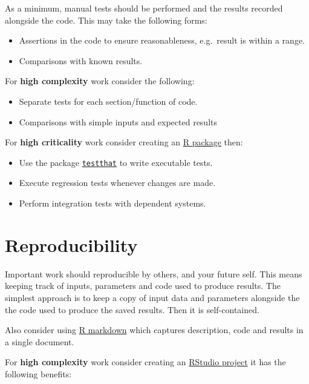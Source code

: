 \documentclass[]{book}
\providecommand{\tightlist}{%
  \setlength{\itemsep}{0pt}\setlength{\parskip}{0pt}}
\theoremstyle{definition}
\theoremstyle{definition}
\theoremstyle{definition}
\theoremstyle{remark}
\begin{document}
As a minimum, manual tests should be performed and the results recorded
alongside the code. This may take the following forms:

\begin{itemize}
\tightlist
\item
  Assertions in the code to ensure reasonableness, e.g.~result is within
  a range.
\item
  Comparisons with known results.
\end{itemize}

For \textbf{high complexity} work consider the following:

\begin{itemize}
\tightlist
\item
  Separate tests for each section/function of code.
\item
  Comparisons with simple inputs and expected results
\end{itemize}

For \textbf{high criticality} work consider creating an
\href{packages-development.html}{R package} then:

\begin{itemize}
\tightlist
\item
  Use the package
  \href{packages-development.html\#testing}{\texttt{testthat}} to write
  executable tests.
\item
  Execute regression tests whenever changes are made.
\item
  Perform integration tests with dependent systems.
\end{itemize}

\section{Reproducibility}\label{reproducibility}

Important work should reproducible by others, and your future self. This
means keeping track of inputs, parameters and code used to produce
results. The simplest approach is to keep a copy of input data and
parameters alongside the the code used to produce the saved results.
Then it is self-contained.

Also consider using \href{writing-rmarkdown.html}{R markdown} which
captures description, code and results in a single document.

For \textbf{high complexity} work consider creating an
\href{writing-structure.html\#projects}{RStudio project} it has the
following benefits:
\end{document}
